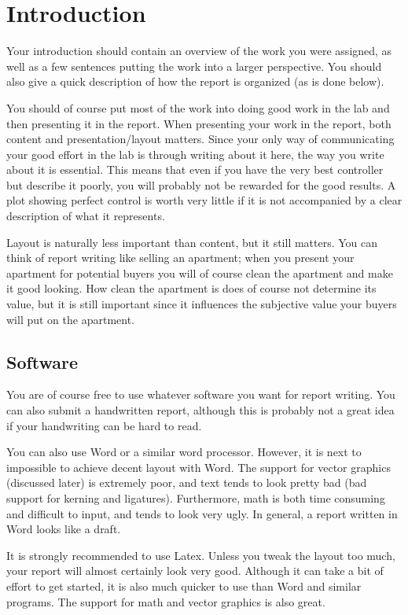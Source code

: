\section{Introduction}\label{sec:intro}
Your introduction should contain an overview of the work you were assigned, as well as a few sentences putting the work into a larger perspective. You should also give a quick description of how the report is organized (as is done below).

You should of course put most of the work into doing good work in the lab and then presenting it in the report. When presenting your work in the report, both content and presentation/layout matters. Since your only way of communicating your good effort in the lab is through writing about it here, the way you write about it is essential. This means that even if you have the very best controller but describe it poorly, you will probably not be rewarded for the good results. A plot showing perfect control is worth very little if it is not accompanied by a clear description of what it represents.

Layout is naturally less important than content, but it still matters. You can think of report writing like selling an apartment; when you present your apartment for potential buyers you will of course clean the apartment and make it good looking. How clean the apartment is does of course not determine its value, but it is still important since it influences the subjective value your buyers will put on the apartment. 

\subsection{Software}
You are of course free to use whatever software you want for report writing. You can also submit a handwritten report, although this is probably not a great idea if your handwriting can be hard to read. 

You can also use Word or a similar word processor. However, it is next to impossible to achieve decent layout with Word. The support for vector graphics (discussed later) is extremely poor, and text tends to look pretty bad (bad support for kerning and ligatures). Furthermore, math is both time consuming and difficult to input, and tends to look very ugly. In general, a report written in Word looks like a draft.

It is strongly recommended to use Latex. Unless you tweak the layout too much, your report will almost certainly look very good. Although it can take a bit of effort to get started, it is also much quicker to use than Word and similar programs. The support for math and vector graphics is also great.


